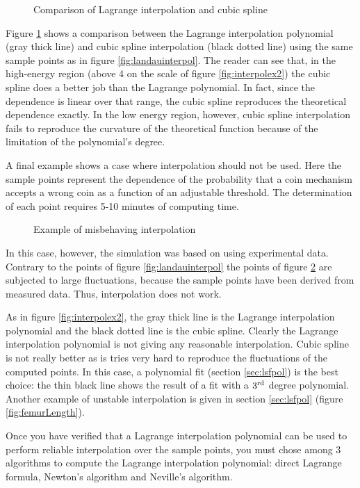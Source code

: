 \documentclass[twoside]{book}
\begin{document}
\begin{figure}
\label{fig:interpolex3}
\center{}
\caption{Comparison of Lagrange interpolation and cubic spline}
\end{figure}
Figure \ref{fig:interpolex3} shows a comparison between the
Lagrange interpolation polynomial (gray thick line) and cubic
spline interpolation (black dotted line) using the same sample
points as in figure \ref{fig:landauinterpol}. The reader can see
that, in the high-energy region (above 4 on the scale of figure
\ref{fig:interpolex2}) the cubic spline does a better job than the
Lagrange polynomial. In fact, since the dependence is linear over
that range, the cubic spline reproduces the theoretical dependence
exactly. In the low energy region, however, cubic spline
interpolation fails to reproduce the curvature of the theoretical
function because of the limitation of the polynomial's degree.

A final example shows a case where interpolation should not be
used. Here the sample points represent the dependence of the
probability that a coin mechanism accepts a wrong coin as a
function of an adjustable threshold. The determination of each
point requires 5-10 minutes of computing time.
\begin{figure}
\label{fig:interpolex4}
\center{}
\caption{Example of misbehaving interpolation}
\end{figure}
In this case, however, the simulation was based on using
experimental data. Contrary to the points of figure
\ref{fig:landauinterpol} the points of figure
\ref{fig:interpolex4} are subjected to large fluctuations, because
the sample points have been derived from measured data. Thus,
interpolation does not work.

As in figure \ref{fig:interpolex2}, the gray thick line is the
Lagrange interpolation polynomial and the black dotted line is the
cubic spline. Clearly the Lagrange interpolation polynomial is not
giving any reasonable interpolation. Cubic spline is not really
better as is tries very hard to reproduce the fluctuations of the
computed points. In this case, a polynomial fit (\cf section
\ref{sec:lsfpol}) is the best choice: the thin black line shows
the result of a fit with a $3^{\mathop{\rm rd}}$ degree
polynomial. Another example of unstable interpolation is given in
section \ref{sec:lsfpol} (figure \ref{fig:femurLength}).

 Once
you have verified that a Lagrange interpolation polynomial can be
used to perform reliable interpolation over the sample points, you
must chose among 3 algorithms to compute the Lagrange
interpolation polynomial: direct Lagrange formula, Newton's
algorithm and Neville's algorithm.
\end{document}

